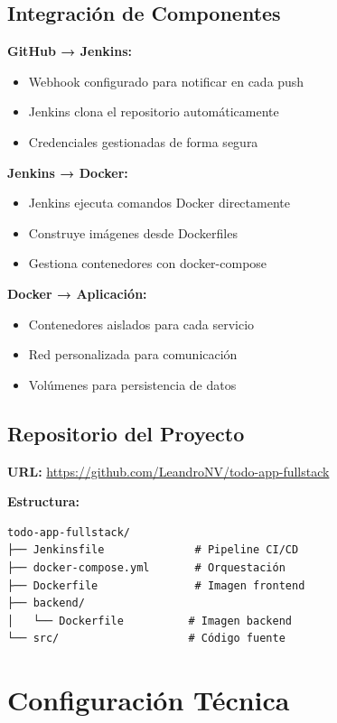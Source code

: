 \documentclass[12pt,a4paper]{article}
\begin{document}
\subsection{Integración de Componentes}

\textbf{GitHub → Jenkins:}
\begin{itemize}
    \item Webhook configurado para notificar en cada push
    \item Jenkins clona el repositorio automáticamente
    \item Credenciales gestionadas de forma segura
\end{itemize}

\textbf{Jenkins → Docker:}
\begin{itemize}
    \item Jenkins ejecuta comandos Docker directamente
    \item Construye imágenes desde Dockerfiles
    \item Gestiona contenedores con docker-compose
\end{itemize}

\textbf{Docker → Aplicación:}
\begin{itemize}
    \item Contenedores aislados para cada servicio
    \item Red personalizada para comunicación
    \item Volúmenes para persistencia de datos
\end{itemize}

\subsection{Repositorio del Proyecto}

\textbf{URL:} \url{https://github.com/LeandroNV/todo-app-fullstack}

\textbf{Estructura:}
\begin{lstlisting}
todo-app-fullstack/
├── Jenkinsfile              # Pipeline CI/CD
├── docker-compose.yml       # Orquestación
├── Dockerfile               # Imagen frontend
├── backend/
│   └── Dockerfile          # Imagen backend
└── src/                    # Código fuente
\end{lstlisting}

\newpage

\section{Configuración Técnica}
\end{document}
